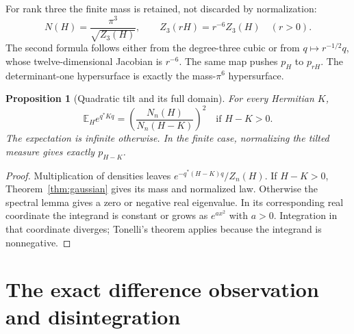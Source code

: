 \documentclass[11pt,a4paper]{article}
\numberwithin{equation}{section}
\newtheorem{proposition}[theorem]{Proposition}
\theoremstyle{definition}
\theoremstyle{remark}
\newcommand{\EE}{\mathbb E}
\begin{document}
For rank three the finite mass is retained, not discarded by normalization:
\begin{equation}\label{eq:massscaling}
N(H)=\frac{\pi^3}{\sqrt{Z_3(H)}},\qquad
Z_3(rH)=r^{-6}Z_3(H)\quad(r>0).
\end{equation}
The second formula follows either from the degree-three cubic or from
$q\mapsto r^{-1/2}q$, whose twelve-dimensional Jacobian is $r^{-6}$.
The same map pushes $p_H$ to $p_{rH}$.
The determinant-one hypersurface is exactly the mass-$\pi^6$ hypersurface.

\begin{proposition}[Quadratic tilt and its full domain]\label{prop:tilt}
For every Hermitian $K$,
\begin{equation}\label{eq:tilt}
\EE_H e^{q^*Kq}=
\left(\frac{N_n(H)}{N_n(H-K)}\right)^2
\quad\text{if }H-K>0.
\end{equation}
The expectation is infinite otherwise. In the finite case, normalizing
the tilted measure gives exactly $p_{H-K}$.
\end{proposition}
\begin{proof}
Multiplication of densities leaves $e^{-q^*(H-K)q}/Z_n(H)$.
If $H-K>0$, Theorem~\ref{thm:gaussian} gives its mass and normalized law.
Otherwise the spectral lemma gives a zero or negative real eigenvalue.
In its corresponding real coordinate the integrand is constant or grows
as $e^{a x^2}$ with $a>0$. Integration in that coordinate diverges;
Tonelli's theorem applies because the integrand is nonnegative.
\end{proof}

\section{The exact difference observation and disintegration}\label{sec:disintegration}
\end{document}
